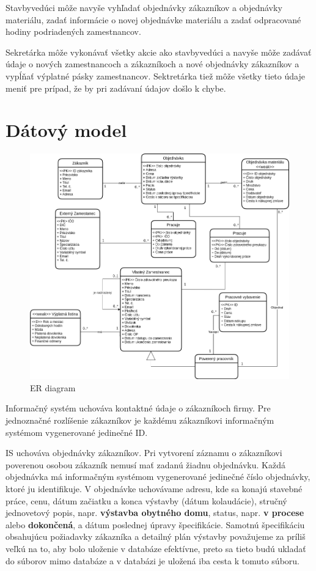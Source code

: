\documentclass[a4paper]{article}
\begin{document}
Stavbyvedúci môže navyše vyhľadať objednávky zákazníkov a objednávky materiálu, zadať informácie o novej objednávke materiálu a zadať odpracované hodiny podriadených zamestnancov.

Sekretárka môže vykonávať všetky akcie ako stavbyvedúci a navyše môže zadávať údaje o nových zamestnancoch a zákazníkoch a nové objednávky zákazníkov a vypĺňať výplatné pásky zamestnancov.
Sektretárka tiež môže všetky tieto údaje meniť pre prípad, že by pri zadávaní údajov došlo k chybe.

\section{Dátový model}

\begin{figure}[H]
    \centering
    \includegraphics[width=\linewidth,height=0.7\textheight,keepaspectratio]{StavebnaFirma.png}
    \caption{ER diagram}
\end{figure}

Informačný systém uchováva kontaktné údaje o zákazníkoch firmy.
Pre jednoznačné rozlíšenie zákazníkov je každému zákazníkovi informačným systémom vygenerované jedinečné ID.\@

IS uchováva objednávky zákazníkov.
Pri vytvorení záznamu o zákazníkovi poverenou osobou zákazník nemusí mať zadanú žiadnu objednávku.
Každá objednávka má informačným systémom vygenerované jedinečné číslo objednávky, ktoré ju identifikuje.
V objednávke uchovávame adresu, kde sa konajú stavebné práce, cenu, dátum začiatku a konca výstavby (dátum kolaudácie), stručný jednovetový popis, napr. \textbf{výstavba obytného domu}, status, napr. \textbf{v procese} alebo \textbf{dokončená}, a dátum poslednej úpravy špecifikácie.
Samotnú špecifikáciu obsahujúcu požiadavky zákazníka a detailný plán výstavby považujeme za príliš veľkú na to, aby bolo uloženie v databáze efektívne, preto sa tieto budú ukladať do súborov mimo databáze a v databázi je uložená iba  cesta k tomuto súboru.\@
\end{document}
